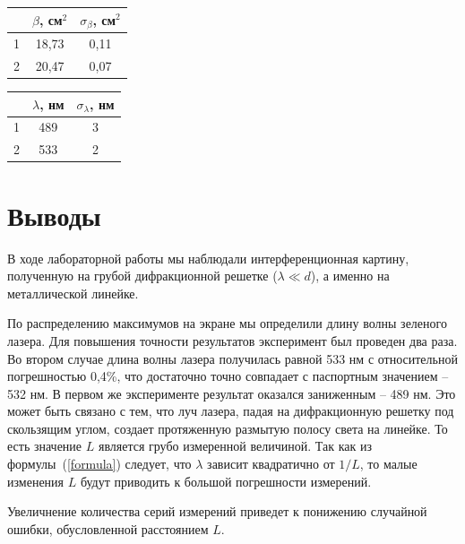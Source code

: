 \documentclass[a4paper,12pt]{article} %
\begin{document}
		\begin{table}[h!]
			\begin{floatrow}
				{\begin{tabular}{|c|c|c|}
						\hline
						& $\beta$, см$^2$ & $\sigma_\beta$, см$^2$ \\ \hline
						1 & 18,73           & 0,11                   \\ \hline
						2 & 20,47           & 0,07                   \\ \hline
				\end{tabular}}
				{\begin{tabular}{|c|c|c|}
						\hline
						& $\lambda$, нм & $\sigma_\lambda$, нм \\ \hline
						1 & 489           & 3                    \\ \hline
						2 & 533           & 2                    \\ \hline
				\end{tabular}}        
			\end{floatrow}
		\end{table}

\section{Выводы}
	В ходе лабораторной работы мы наблюдали интерференционная картину, полученную на грубой дифракционной решетке ($\lambda \ll d $), а именно на металлической линейке. 
	
	По распределению максимумов на экране мы определили длину волны зеленого лазера. Для повышения точности результатов эксперимент был проведен два раза. Во втором случае длина волны лазера получилась равной 533 нм с относительной погрешностью 0,4\%, что достаточно точно совпадает с паспортным значением -- 532 нм. В первом же эксперименте результат оказался заниженным -- 489 нм. Это может быть связано с тем, что луч лазера, падая на дифракционную решетку под скользящим углом, создает протяженную размытую полосу света на линейке. То есть значение $L$ является грубо измеренной величиной. Так как из формулы~(\ref{formula}) следует, что $\lambda$ зависит квадратично от $1/L$, то малые изменения $L$ будут приводить к большой погрешности измерений.
	
	Увеличнение количества серий измерений приведет к понижению случайной ошибки, обусловленной расстоянием $L$.



	
\end{document}
